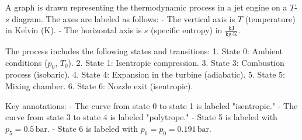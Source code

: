 A graph is drawn representing the thermodynamic process in a jet engine on a \( T \)-\( s \) diagram. The axes are labeled as follows:  
- The vertical axis is \( T \) (temperature) in Kelvin (\( \text{K} \)).  
- The horizontal axis is \( s \) (specific entropy) in \( \frac{\text{kJ}}{\text{kg·K}} \).  

The process includes the following states and transitions:  
1. State 0: Ambient conditions (\( p_0 \), \( T_0 \)).  
2. State 1: Isentropic compression.  
3. State 3: Combustion process (isobaric).  
4. State 4: Expansion in the turbine (adiabatic).  
5. State 5: Mixing chamber.  
6. State 6: Nozzle exit (isentropic).  

Key annotations:  
- The curve from state 0 to state 1 is labeled "isentropic."  
- The curve from state 3 to state 4 is labeled "polytrope."  
- State 5 is labeled with \( p_5 = 0.5 \, \text{bar} \).  
- State 6 is labeled with \( p_6 = p_0 = 0.191 \, \text{bar} \).